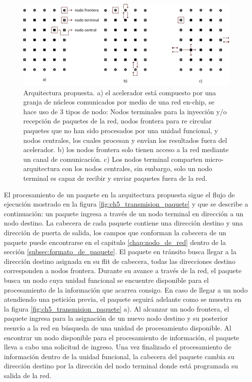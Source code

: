 \begin{figure}
	\begin{center}
		\includegraphics[scale=0.7]{figures/ch5_propuesta_net.png}
	\end{center}
	\caption
		{	
			Arquitectura propuesta. a) el acelerador está compuesto por una granja de núcleos comunicados por medio de una red en-chip, se hace uso de 3 tipos de nodo: Nodos terminales para la inyección y/o recepción de paquetes de la red, nodos frontera para re circular paquetes que no han sido procesados por una unidad funcional, y nodos centrales, los cuales procesan y envían los resultados fuera del acelerador. b) los nodos frontera solo tienen acceso a la red mediante un canal de comunicación. c) Los nodos terminal comparten micro-arquitectura con los nodos centrales, sin embargo, solo un nodo terminal es capaz de recibir y enviar paquetes fuera de la red.
		}
	\label{fig:ch5_propuesta_net}
\end{figure}

El procesamiento de un paquete en la arquitectura propuesta sigue el flujo de ejecución mostrado en la figura \ref{fig:ch5_transmision_paquete} y que se describe a continuación: un paquete ingresa a través de un nodo terminal en dirección a un nodo destino. La cabecera de cada paquete contiene una dirección destino y una dirección de puerta de salida, los campos que conforman la cabecera de un paquete puede encontrarse en el capitulo \ref{chap:nodo_de_red} dentro de la sección \ref{subsec:formato_de_paquete}. El paquete en tránsito busca llegar a la dirección destino asignada en su flit de cabecera, todas las direcciones destino corresponden a nodos frontera. Durante su avance a través de la red, el paquete busca un nodo cuya unidad funcional se encuentre disponible para el procesamiento de la información que acarrea consigo. En caso de llegar a un nodo atendiendo una petición previa, el paquete seguirá adelante como se muestra en la figura \ref{fig:ch5_transmision_paquete} a). Al alcanzar un nodo frontera, el paquete ingresa para la asignación de un nuevo nodo destino y su posterior reenvío a la red en búsqueda de una unidad de procesamiento disponible. Al encontrar un nodo disponible para el procesamiento de información, el paquete lleva a cabo una solicitud de ingreso. Una vez finalizado el procesamiento de información dentro de la unidad funcional, la cabecera del paquete cambia su dirección destino por la dirección del nodo terminal donde está programada su salida de la red. 


